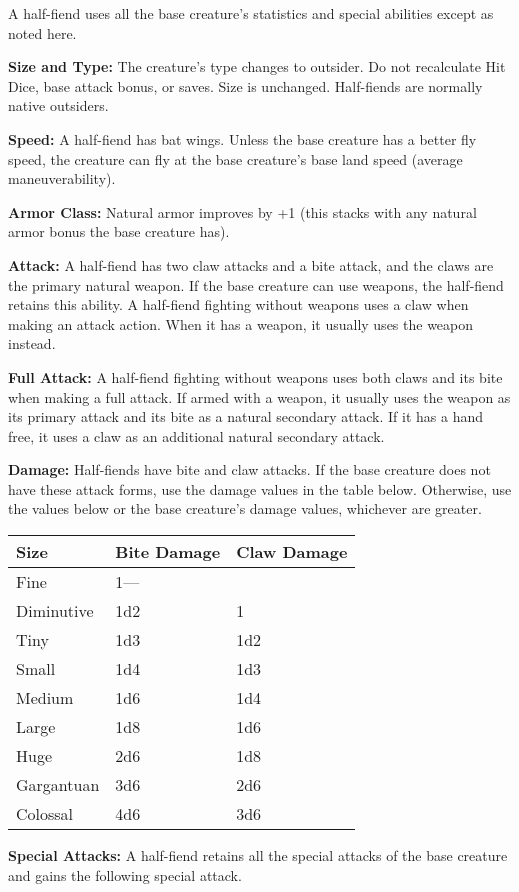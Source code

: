 \documentclass{article}
\begin{document}
A half-fiend uses all the base creature's statistics and special abilities except 
as noted here.

\textbf{Size and Type: }The creature's type changes to outsider. Do not recalculate 
Hit Dice, base attack bonus, or saves. Size is unchanged. Half-fiends are normally 
native outsiders.

\textbf{Speed:} A half-fiend has bat wings. Unless the base creature has a better 
fly speed, the creature can fly at the base creature's base land speed (average 
maneuverability).

\textbf{Armor Class:} Natural armor improves by +1 (this stacks with any natural 
armor bonus the base creature has).

\textbf{Attack:} A half-fiend has two claw attacks and a bite attack, and the claws 
are the primary natural weapon. If the base creature can use weapons, the half-fiend 
retains this ability. A half-fiend fighting without weapons uses a claw when making 
an attack action. When it has a weapon, it usually uses the weapon instead.

\textbf{Full Attack:} A half-fiend fighting without weapons uses both claws and 
its bite when making a full attack. If armed with a weapon, it usually uses the 
weapon as its primary attack and its bite as a natural secondary attack. If it 
has a hand free, it uses a claw as an additional natural secondary attack.

\textbf{Damage: }Half-fiends have bite and claw attacks. If the base creature does 
not have these attack forms, use the damage values in the table below. Otherwise, 
use the values below or the base creature's damage values, whichever are greater.

\begin{tabular}{|>{\raggedright}p{45pt}|>{\raggedright}p{53pt}|>{\raggedright}p{58pt}|}
\hline
S\textbf{ize} & B\textbf{ite Damage} & C\textbf{law Damage}\tabularnewline
\hline
Fine & 1--- & \tabularnewline
\hline
Diminutive & 1d2 & 1\tabularnewline
\hline
Tiny & 1d3 & 1d2\tabularnewline
\hline
Small & 1d4 & 1d3\tabularnewline
\hline
Medium & 1d6 & 1d4\tabularnewline
\hline
Large & 1d8 & 1d6\tabularnewline
\hline
Huge & 2d6 & 1d8\tabularnewline
\hline
Gargantuan & 3d6 & 2d6\tabularnewline
\hline
Colossal & 4d6 & 3d6\tabularnewline
\hline
\end{tabular}

\textbf{Special Attacks: }A half-fiend retains all the special attacks of the base 
creature and gains the following special attack.
\end{document}
